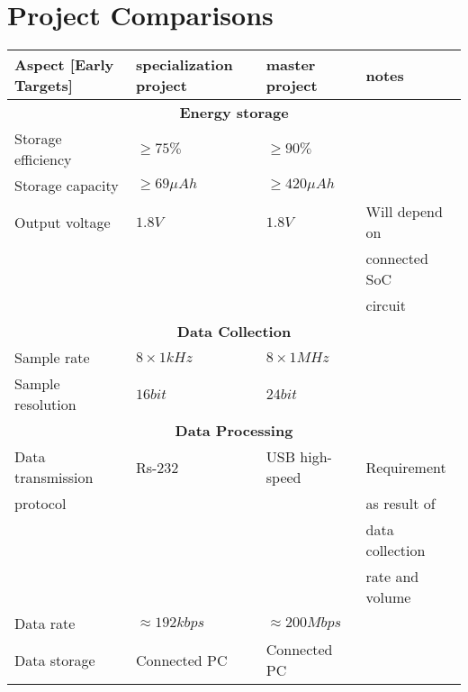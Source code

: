 \documentclass[a4paper, 12pt]{report}
\begin{document}
\chapter{Project Comparisons}
\begin{table}[h!]
    \begin{tabular}{|l|l|l|l|}
        \hline
        \textbf{Aspect [Early Targets]} & \textbf{specialization project} & \textbf{master project} & \textbf{notes} \\
        \hline
        \multicolumn{4}{|c|}{\textbf{Energy storage}} \\
        \hline
        Storage efficiency & $\geq 75\%$ &  $\geq 90\%$ & \\
        \hline
        Storage capacity & $\geq 69 \mu Ah$ & $\geq  420 \mu Ah$ & \\
        \hline
        Output voltage & $ 1.8 V$ & $ 1.8 V$ & Will depend on\\
        &&& connected SoC\\
        &&& circuit \\
        \hline
        \multicolumn{4}{|c|}{\textbf{Data Collection}} \\
        \hline
        Sample rate & $8\times 1 kHz$ & $8\times 1 MHz$ & \\
        \hline
        Sample resolution & $16 bit$ & $24 bit$ & \\
        \hline
        \multicolumn{4}{|c|}{\textbf{Data Processing}} \\
        \hline
        Data transmission & Rs-232 & USB high-speed & Requirement \\
        protocol &&& as result of\\
        &&& data collection \\
        &&& rate and volume\\
        \hline
        Data rate & $  \approx 192 kbps$ & $\approx 200 Mbps$ & \\
        \hline
        Data storage & Connected PC & Connected PC & \\
        \hline
    \end{tabular}
\end{table}
\end{document}
